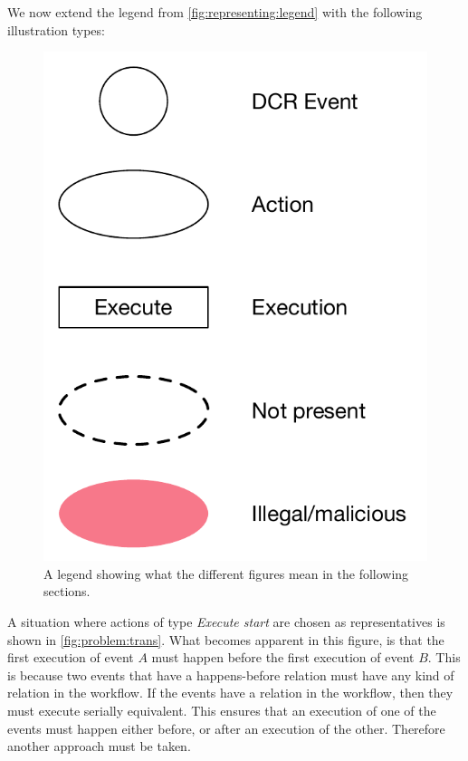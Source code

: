 	\newpar We now extend the legend from \autoref{fig:representing:legend} with the following illustration types:
    
    \begin{figure}[H]
		\centering
		\includegraphics[height=0.25\textheight]{6validation/images/legend-extended.pdf}
		\caption{A legend showing what the different figures mean in the following sections.}
		\label{fig:representing:legend-extended}
	\end{figure}
	
	\noindent A situation where actions of type \textit{Execute start} are chosen as representatives is shown in \autoref{fig:problem:trans}. What becomes apparent in this figure, is that the first execution of event $A$ must happen before the first execution of event $B$. This is because two events that have a happens-before relation must have any kind of relation in the workflow. If the events have a relation in the workflow, then they must execute serially equivalent. This ensures that an execution of one of the events must happen either before, or after an execution of the other. Therefore another approach must be taken.
	

